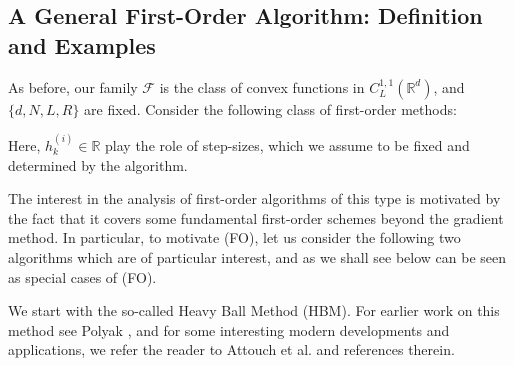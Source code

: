 \documentclass[12pt]{article}
\numberwithin{equation}{section}
\theoremstyle{definition}
\theoremstyle{remark}
\def\real{\mathbb{R}}
\begin{document}
\subsection{A General First-Order Algorithm: Definition and Examples}

As before, our family $\mathcal{F}$ is the class of convex functions in $C^{1,1}_L(\real^d)$,
and $\{d,N,L, R\}$ are fixed. Consider the following class of first-order methods:
\medskip

\medskip

Here, $h_k^{(i)} \in \real$ play the role of step-sizes, which we assume to be fixed and determined by
the algorithm.

The interest in the analysis of first-order algorithms of this type is motivated by the fact
that it covers some fundamental first-order schemes beyond the gradient method. In particular,
to motivate (FO), let us consider the following two algorithms which are of particular
interest, and as we shall see below can be seen as special cases of (FO).

We start with the so-called Heavy Ball Method (HBM). For earlier work on this method see
Polyak \cite{polyak1964}, and for some interesting modern developments and applications, we
refer the reader to Attouch et al. \cite{atto-goud-redo-97, atto-bolt-redo-02} and references
therein.
\end{document}

